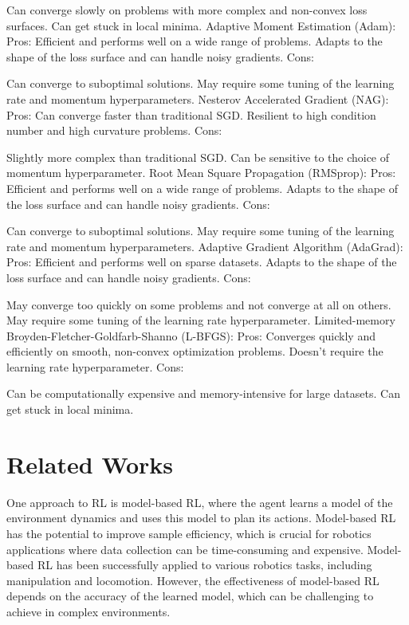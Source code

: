 Can converge slowly on problems with more complex and non-convex loss surfaces.
Can get stuck in local minima.
Adaptive Moment Estimation (Adam):
Pros:
Efficient and performs well on a wide range of problems.
Adapts to the shape of the loss surface and can handle noisy gradients.
Cons:

Can converge to suboptimal solutions.
May require some tuning of the learning rate and momentum hyperparameters.
Nesterov Accelerated Gradient (NAG):
Pros:
Can converge faster than traditional SGD.
Resilient to high condition number and high curvature problems.
Cons:

Slightly more complex than traditional SGD.
Can be sensitive to the choice of momentum hyperparameter.
Root Mean Square Propagation (RMSprop):
Pros:
Efficient and performs well on a wide range of problems.
Adapts to the shape of the loss surface and can handle noisy gradients.
Cons:

Can converge to suboptimal solutions.
May require some tuning of the learning rate and momentum hyperparameters.
Adaptive Gradient Algorithm (AdaGrad):
Pros:
Efficient and performs well on sparse datasets.
Adapts to the shape of the loss surface and can handle noisy gradients.
Cons:

May converge too quickly on some problems and not converge at all on others.
May require some tuning of the learning rate hyperparameter.
Limited-memory Broyden-Fletcher-Goldfarb-Shanno (L-BFGS):
Pros:
Converges quickly and efficiently on smooth, non-convex optimization problems.
Doesn't require the learning rate hyperparameter.
Cons:

Can be computationally expensive and memory-intensive for large datasets.
Can get stuck in local minima.

\section{Related Works}

One approach to RL is model-based RL, where the agent learns a model of the environment dynamics and uses this model to plan its actions. Model-based RL has the potential to improve sample efficiency, which is crucial for robotics applications where data collection can be time-consuming and expensive. Model-based RL has been successfully applied to various robotics tasks, including manipulation and locomotion. However, the effectiveness of model-based RL depends on the accuracy of the learned model, which can be challenging to achieve in complex environments.

